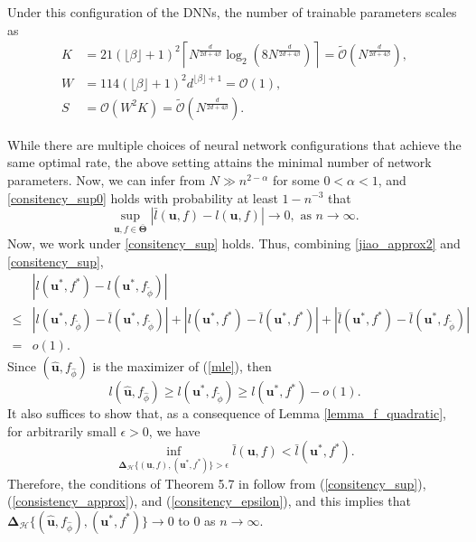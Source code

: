 \documentclass[
  12pt]{article}
\begin{document}
\noindent
Under this configuration of the DNNs, the number of trainable parameters scales as
$$ \begin{aligned}
K&=21(\lfloor\beta\rfloor+1)^2\left\lceil N^{\frac{d}{2d+4\beta}} \log _2\left(8 N^{\frac{d}{2d+4\beta}}\right)\right\rceil =\widetilde{\mathcal{O}}\left(N^{\frac{d}{2 d+4 \beta}}\right), \\
W&=114(\lfloor\beta\rfloor+1)^2 d^{\lfloor\beta\rfloor+1} = \mathcal{O}(1),\\
S &=\mathcal{O}(W^2 K)=\widetilde{\mathcal{O}}\left(N^{\frac{d}{2 d+4 \beta}}\right).
\end{aligned}$$ 

\noindent While there are multiple choices of neural network configurations that achieve the same optimal rate, the above setting attains the minimal number of network parameters. Now, we can infer from $N \gg n^{2-\alpha}$ for some $0<\alpha<1$, and \eqref{consitency_sup0} holds with probability at least $1 - n^{-3}$ that
\begin{equation}\label{consitency_sup}
    \sup _{\boldsymbol{u},f \in \bar{\boldsymbol{\Theta}}}\left|\bar{l}(\boldsymbol{u},f)-l(\boldsymbol{u},f)\right| \xrightarrow{} 0, \text { as } n \rightarrow \infty.
\end{equation}
Now, we work under \eqref{consitency_sup} holds. Thus, combining \eqref{jiao_approx2} and \eqref{consitency_sup},
$$\begin{aligned}
     &\left|l(\boldsymbol{u}^*,f^*)-l(\boldsymbol{u}^*,f_{\widetilde{\phi}})\right|\\ \leq &
     \left|l(\boldsymbol{u}^*,f_{\widetilde{\phi}})-\bar{l}(\boldsymbol{u}^*,f_{\widetilde{\phi}})\right|+\left|l(\boldsymbol{u}^*,f^*)-\bar{l}(\boldsymbol{u}^*,f^*)\right|+
     \left|\bar{l}(\boldsymbol{u}^*,f^*)-\bar{l}(\boldsymbol{u}^*,f_{\widetilde{\phi}})\right|\\
     =& o(1).
\end{aligned}$$
\noindent Since $(\widehat{\boldsymbol{u}},f_{\widehat{\phi}})$ is the maximizer of (\ref{mle}), then 
\begin{equation} \label{consistency_approx}
l(\widehat{\boldsymbol{u}},f_{\widehat{\phi}})\geq l(\boldsymbol{u}^*,f_{\widetilde{\phi}})\geq l(\boldsymbol{u}^*,f^*)-o(1). 
\end{equation}
\noindent It also suffices to show that, as a consequence of Lemma \ref{lemma_f_quadratic}, for arbitrarily small $\epsilon>0$, we have
\begin{equation}\label{consitency_epsilon}
\inf_{\mathbf{\Delta}_{\mathcal{H}}\{(\boldsymbol{u},f),(\boldsymbol{u}^*,f^*)\}>\epsilon} \bar{l}(\boldsymbol{u},f)<\bar{l}(\boldsymbol{u}^*,f^*).
\end{equation}
\noindent Therefore, the conditions of Theorem 5.7 in \cite{van2000asymptotic} follow from (\ref{consitency_sup}), (\ref{consistency_approx}), and (\ref{consitency_epsilon}), and this implies that $\mathbf{\Delta}_{\mathcal{H}}\{(\widehat{\boldsymbol{u}},f_{\widehat{\phi}}), (\boldsymbol{u}^*,f^*)\} \xrightarrow{} 0$ to $0$ as $n \rightarrow \infty$.
    
\end{document}
